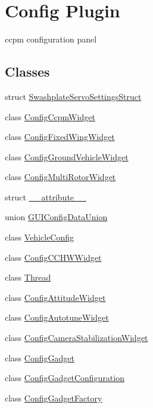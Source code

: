 \hypertarget{group___config_plugin}{\section{\-Config \-Plugin}
\label{group___config_plugin}
}


ccpm configuration panel  


\subsection*{\-Classes}
\begin{DoxyCompactItemize}
\item 
struct \hyperlink{struct_swashplate_servo_settings_struct}{\-Swashplate\-Servo\-Settings\-Struct}
\item 
class \hyperlink{class_config_ccpm_widget}{\-Config\-Ccpm\-Widget}
\item 
class \hyperlink{class_config_fixed_wing_widget}{\-Config\-Fixed\-Wing\-Widget}
\item 
class \hyperlink{class_config_ground_vehicle_widget}{\-Config\-Ground\-Vehicle\-Widget}
\item 
class \hyperlink{class_config_multi_rotor_widget}{\-Config\-Multi\-Rotor\-Widget}
\item 
struct \hyperlink{struct____attribute____}{\-\_\-\-\_\-attribute\-\_\-\-\_\-}
\item 
union \hyperlink{union_g_u_i_config_data_union}{\-G\-U\-I\-Config\-Data\-Union}
\item 
class \hyperlink{class_vehicle_config}{\-Vehicle\-Config}
\item 
class \hyperlink{class_config_c_c_h_w_widget}{\-Config\-C\-C\-H\-W\-Widget}
\item 
class \hyperlink{class_thread}{\-Thread}
\item 
class \hyperlink{class_config_attitude_widget}{\-Config\-Attitude\-Widget}
\item 
class \hyperlink{class_config_autotune_widget}{\-Config\-Autotune\-Widget}
\item 
class \hyperlink{class_config_camera_stabilization_widget}{\-Config\-Camera\-Stabilization\-Widget}
\item 
class \hyperlink{class_config_gadget}{\-Config\-Gadget}
\item 
class \hyperlink{class_config_gadget_configuration}{\-Config\-Gadget\-Configuration}
\item 
class \hyperlink{class_config_gadget_factory}{\-Config\-Gadget\-Factory}

\end{DoxyCompactItemize}
